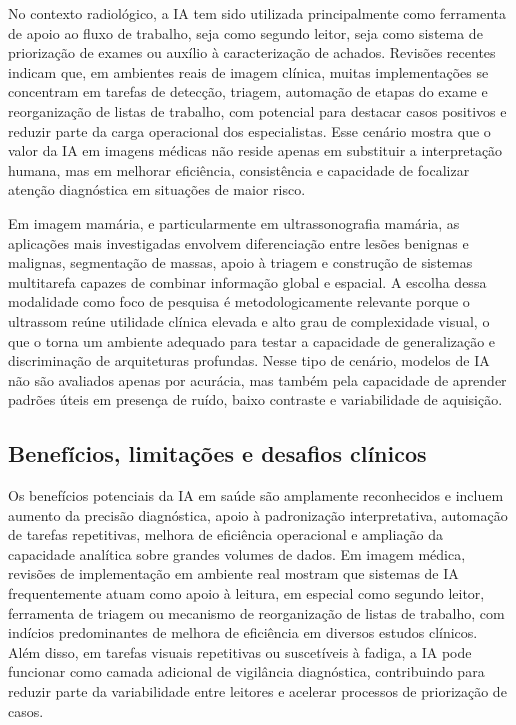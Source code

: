 \documentclass[tcc,capa]{texufpel}
\begin{document}
No contexto radiológico, a IA tem sido utilizada principalmente como ferramenta de apoio ao fluxo de trabalho, seja como segundo leitor, seja como sistema de priorização de exames ou auxílio à caracterização de achados. Revisões recentes indicam que, em ambientes reais de imagem clínica, muitas implementações se concentram em tarefas de detecção, triagem, automação de etapas do exame e reorganização de listas de trabalho, com potencial para destacar casos positivos e reduzir parte da carga operacional dos especialistas. Esse cenário mostra que o valor da IA em imagens médicas não reside apenas em substituir a interpretação humana, mas em melhorar eficiência, consistência e capacidade de focalizar atenção diagnóstica em situações de maior risco. \cite{Gu2025Workflow,Lawrence2025RadiologyAI,Aggarwal2021DLAccuracy}

Em imagem mamária, e particularmente em ultrassonografia mamária, as aplicações mais investigadas envolvem diferenciação entre lesões benignas e malignas, segmentação de massas, apoio à triagem e construção de sistemas multitarefa capazes de combinar informação global e espacial. A escolha dessa modalidade como foco de pesquisa é metodologicamente relevante porque o ultrassom reúne utilidade clínica elevada e alto grau de complexidade visual, o que o torna um ambiente adequado para testar a capacidade de generalização e discriminação de arquiteturas profundas. Nesse tipo de cenário, modelos de IA não são avaliados apenas por acurácia, mas também pela capacidade de aprender padrões úteis em presença de ruído, baixo contraste e variabilidade de aquisição. \cite{Liu2025AIBUS,Dan2024,Guo2018}

\subsection{Benefícios, limitações e desafios clínicos}

Os benefícios potenciais da IA em saúde são amplamente reconhecidos e incluem aumento da precisão diagnóstica, apoio à padronização interpretativa, automação de tarefas repetitivas, melhora de eficiência operacional e ampliação da capacidade analítica sobre grandes volumes de dados. Em imagem médica, revisões de implementação em ambiente real mostram que sistemas de IA frequentemente atuam como apoio à leitura, em especial como segundo leitor, ferramenta de triagem ou mecanismo de reorganização de listas de trabalho, com indícios predominantes de melhora de eficiência em diversos estudos clínicos. Além disso, em tarefas visuais repetitivas ou suscetíveis à fadiga, a IA pode funcionar como camada adicional de vigilância diagnóstica, contribuindo para reduzir parte da variabilidade entre leitores e acelerar processos de priorização de casos. \cite{WHO2021AI,Yu2018AIHealthcare,Wenderott2024,Gu2025Workflow,Lawrence2025RadiologyAI}
\end{document}
